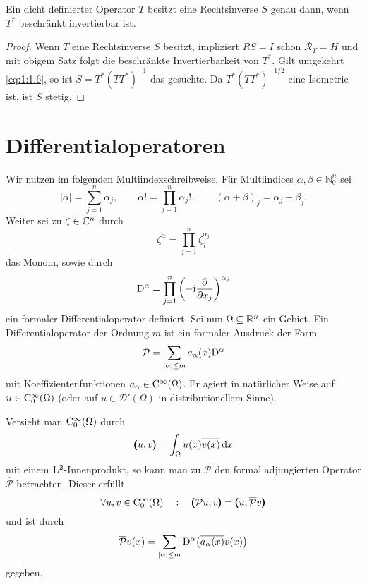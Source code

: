\begin{cor}\label{cor:1:1.3}
Ein dicht definierter Operator $T$ besitzt eine Rechtsinverse $S$ genau dann, wenn $T^*$ beschränkt invertierbar ist.
\end{cor}
\begin{proof}
Wenn $T$ eine Rechtsinverse $S$ besitzt, impliziert $RS=I$ schon $\mathcal R_T=H$ und mit obigem Satz folgt die beschränkte Invertierbarkeit von $T^*$. Gilt umgekehrt \eqref{eq:1:1.6}, so ist $S=T^*(TT^*)^{-1}$ das gesuchte. Da $T^*(TT^*)^{-1/2}$ eine Isometrie ist, ist $S$ stetig.
\end{proof}

\section{Differentialoperatoren} 
Wir nutzen im folgenden Multiindexschreibweise. Für Multiindices $\alpha,\beta\in\mathbb N_0^n$ sei
\begin{equation}
|\alpha|=\sum_{j=1}^n \alpha_j,\qquad \alpha! = \prod_{j=1}^n \alpha_j!,\qquad (\alpha+\beta)_j=\alpha_j+\beta_j.
\end{equation} 
Weiter sei zu $\zeta\in\mathbb C^n$ durch
\begin{equation}
   \zeta^\alpha = \prod_{j=1}^n \zeta_j^{\alpha_j}
\end{equation}
das Monom, sowie durch
\begin{equation}
   \mathrm D^\alpha = \prod_{j=1}^n \left(- \mathrm i \frac{\partial}{\partial x_j}\right)^{\alpha_j}
\end{equation}
ein formaler Differentialoperator definiert. Sei nun $\Omega\subseteq\mathbb R^n$ ein Gebiet. Ein Differentialoperator der Ordnung $m$ ist ein formaler Ausdruck der Form
\begin{equation}
   \mathcal P = \sum_{|\alpha|\le m} a_\alpha(x) \mathrm D^\alpha
\end{equation}
mit Koeffizientenfunktionen $a_\alpha\in \mathrm C^\infty(\Omega)$. Er agiert in nat\"urlicher Weise auf $u\in\mathrm C^\infty_0(\Omega)$ (oder auf $u\in\mathscr D'(\Omega)$ in distributionellem Sinne).

Versieht man $\mathrm C_0^\infty(\Omega)$ durch
\begin{equation}
    \pmb(u,v\pmb) = \int_{\Omega} u(x) \overline{v(x)} \,\mathrm d x
\end{equation}
mit einem $\mathrm L^2$-Innenprodukt, so kann man zu $\mathcal P$ den formal adjungierten Operator $\overline{\mathcal P}$ betrachten. Dieser erf\"ullt
\begin{equation}
   \forall u,v\in\mathrm C_0^\infty(\Omega)\quad:\quad \pmb(\mathcal Pu,v\pmb)=\pmb(u,\mathcal{\overline P}v\pmb)
\end{equation}
und ist durch
\begin{equation}
  \overline{ \mathcal P}v(x) = \sum_{|\alpha|\le m}  \mathrm D^\alpha\big(\overline{a_\alpha(x)}v(x)\big)
\end{equation}
gegeben.


